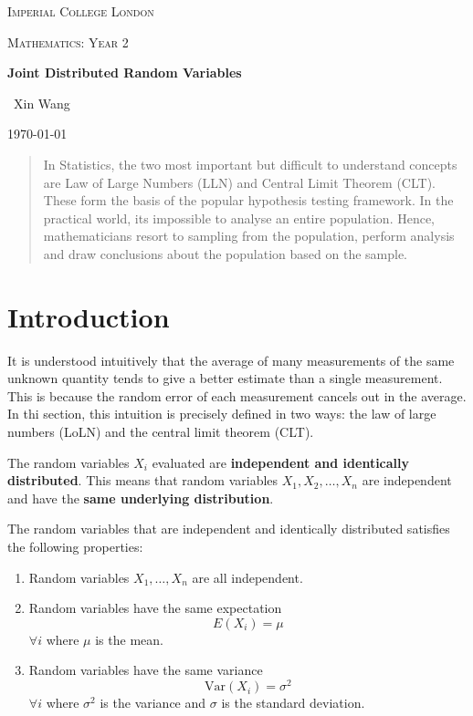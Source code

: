 \documentclass[10pt,a4paper]{article}
\begin{document}
\begin{titlepage}
	\centering
	{\scshape\LARGE Imperial College London \par}
	\vspace{1cm}
	{\scshape\Large Mathematics: Year 2\par}
	\vspace{1.5cm}
	{\huge\bfseries Joint Distributed Random Variables \par}
	\vspace{2cm}
	{\Large\ Xin Wang }
	\vfill
	{\large \today\par}
\end{titlepage}

\begin{abstract}
	In Statistics, the two most important but difficult to understand concepts are Law of Large
	Numbers (LLN) and Central Limit Theorem (CLT). These form the basis of the popular hypothesis
	testing framework. In the practical world, its impossible to analyse an entire population.
	Hence, mathematicians resort to sampling from the population, perform analysis and draw
	conclusions about the population based on the sample.
	
\end{abstract}

\tableofcontents
\pagebreak

\section{Introduction}

It is understood intuitively that the average of many measurements of the same unknown quantity
tends to  give a better estimate than a single measurement. This is because the random error of
each measurement cancels out in the average.  In thi section, this intuition is precisely
defined in two ways: the law of large numbers (LoLN) and the central limit theorem (CLT).

The random variables $X_i$ evaluated are \textbf{independent and identically distributed}. This
means that random variables $X_1,X_2,\dots,X_n$  are independent and have the \textbf{same underlying
distribution}. 

The random variables that are independent and identically distributed satisfies the following properties:
\begin{enumerate}
	\item Random variables $X_1,\dots,X_n$ are all independent.
	\item Random variables have the same expectation 
	$$E(X_i) = \mu$$ 
	$\forall i$ where $\mu$ is the mean.
	\item Random variables have the same variance 
	$$\text{Var}(X_i) = \sigma^2$$
	$\forall i$ where $\sigma^2$ is the variance and $\sigma$ is the standard deviation.
\end{enumerate}
\end{document}
